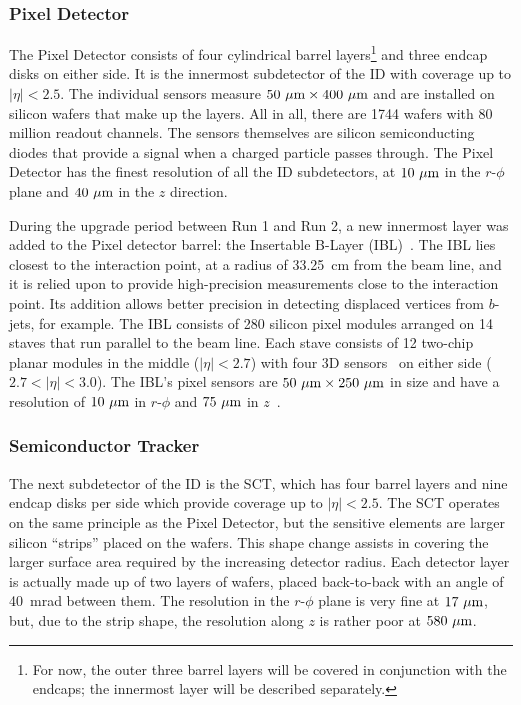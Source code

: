 \subsubsection{Pixel Detector} \label{sec:pixel}
The Pixel Detector consists of four cylindrical barrel layers\footnote{For now, the outer three barrel layers will be covered in conjunction with the endcaps; the innermost layer will be described separately.} and three endcap disks on either side.
It is the innermost subdetector of the ID with coverage up to $|\eta| < 2.5$.
The individual sensors measure $50~\mu\textrm{m}\times 400~\mu\textrm{m}$ and are installed on silicon wafers that make up the layers.
All in all, there are 1744 wafers with 80 million readout channels.
The sensors themselves are silicon semiconducting diodes that provide a signal when a charged particle passes through.
The Pixel Detector has the finest resolution of all the ID subdetectors, at $10~\mu\textrm{m}$ in the $r$-$\phi$ plane and $40~\mu\textrm{m}$ in the $z$ direction.

During the upgrade period between Run 1 and Run 2, a new innermost layer was added to the Pixel detector barrel: the Insertable B-Layer (IBL)~\cite{2010.ibl-tdr}.
The IBL lies closest to the interaction point, at a radius of 33.25~cm from the beam line, and it is relied upon to provide high-precision measurements close to the interaction point.
Its addition allows better precision in detecting displaced vertices from $b$-jets, for example.
The IBL consists of 280 silicon pixel modules arranged on 14 staves that run parallel to the beam line.
Each stave consists of 12 two-chip planar modules in the middle ($|\eta| < 2.7$) with four 3D sensors~\cite{2015.ibl-3d} on either side ($2.7 < |\eta| < 3.0$).
The IBL's pixel sensors are $50~\mu\textrm{m}\times 250~\mu\textrm{m}$ in size and have a resolution of $10~\mu\textrm{m}$ in $r$-$\phi$ and $75~\mu\textrm{m}$ in $z$~\cite{2016.ibl-resolution}.

\subsubsection{Semiconductor Tracker} \label{sec:sct}
The next subdetector of the ID is the SCT, which has four barrel layers and nine endcap disks per side which provide coverage up to $|\eta| < 2.5$.
The SCT operates on the same principle as the Pixel Detector, but the sensitive elements are larger silicon ``strips'' placed on the wafers.
This shape change assists in covering the larger surface area required by the increasing detector radius.
Each detector layer is actually made up of two layers of wafers, placed back-to-back with an angle of 40~mrad between them.
The resolution in the $r$-$\phi$ plane is very fine at $17~\mu\textrm{m}$, but, due to the strip shape, the resolution along $z$ is rather poor at $580~\mu\textrm{m}$.

